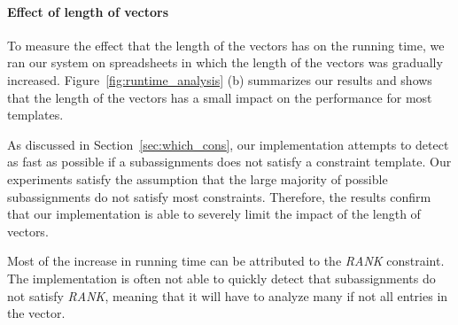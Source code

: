


\paragraph{Effect of length of vectors}
To measure the effect that the length of the vectors has on the running time, we ran our system on spreadsheets in which the length of the vectors was gradually increased.
Figure~\ref{fig:runtime_analysis} (b) summarizes our results and shows that the length of the vectors has a small impact on the performance for most templates.

As discussed in Section~\ref{sec:which_cons}, our implementation attempts to detect as fast as possible if a subassignments does not satisfy a constraint template.
Our experiments satisfy the assumption that the large majority of possible subassignments do not satisfy most constraints.
Therefore, the results confirm that our implementation is able to severely limit the impact of the length of vectors.

Most of the increase in running time can be attributed to the \textit{RANK} constraint.
The implementation is often not able to quickly detect that subassignments do not satisfy \textit{RANK}, meaning that it will have to analyze many if not all entries in the vector.

